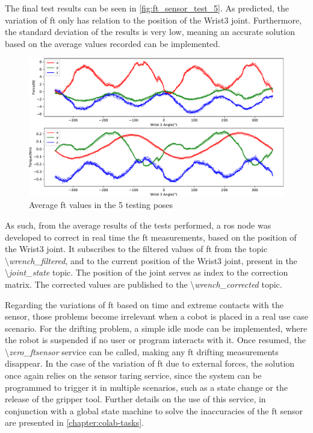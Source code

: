 \par The final test results can be seen in \autoref{fig:ft_sensor_test_5}. As predicted, the variation of \ac{ft} only has relation to the position of the Wrist3 joint. Furthermore, the standard deviation of the results is very low, meaning an accurate solution based on the average values recorded can be implemented.

\begin{figure}[h]
    \centering
    \includegraphics[width=0.8\linewidth]{figs/chp3/ft_sensor_test_5.pdf}
    \caption{Average \ac{ft} values in the 5 testing poses}
    \label{fig:ft_sensor_test_5}
\end{figure}


\par As such, from the average results of the tests performed, a \ac{ros} node was developed to correct in real time the \ac{ft} measurements, based on the position of the Wrist3 joint. It subscribes to the filtered values of \ac{ft} from the topic \textbackslash \textit{wrench\_filtered}, and to the current position of the Wrist3 joint, present in the \textbackslash \textit{joint\_state} topic. The position of the joint serves as index to the correction matrix. The corrected values are published to the \textbackslash \textit{wrench\_corrected} topic.

\par Regarding the variations of \ac{ft} based on time and extreme contacts with the sensor, those problems become irrelevant when a cobot is placed in a real use case scenario. For the drifting problem, a simple idle mode can be implemented, where the robot is suspended if no user or program interacts with it. Once resumed, the \textbackslash\textit{zero\_ftsensor} service can be called, making any \ac{ft} drifting measurements disappear. In the case of the variation of \ac{ft} due to external forces, the solution once again relies on the sensor taring service, since the system can be programmed to trigger it in multiple scenarios, such as a state change or the release of the gripper tool. Further details on the use of this service, in conjunction with a global state machine to solve the inaccuracies of the \ac{ft} sensor are presented in \autoref{chapter:colab-tasks}.

